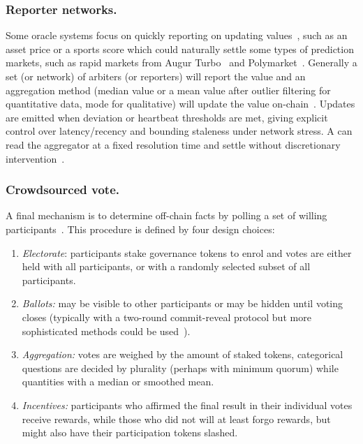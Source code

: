 \subsubsection{Reporter networks.}

Some oracle systems focus on quickly reporting on updating values~\cite{BCCJM21}, such as an asset price or a sports score which could naturally settle some types of prediction markets, such as rapid markets from Augur Turbo~\cite{aug25} and Polymarket~\cite{polylink}. Generally a set (or network) of arbiters (or reporters) will report the value and an aggregation method (\eg median value or a mean value after outlier filtering for quantitative data, mode for qualitative) will update the value on-chain~\cite{ClEsGS21}. Updates are emitted when deviation or heartbeat thresholds are met, giving explicit control over latency/recency and bounding staleness under network stress. A \depm can read the aggregator at a fixed resolution time and settle without discretionary intervention~\cite{aug25,thalesmarket_docs}. 








\subsubsection{Crowdsourced vote.}

A final mechanism is to determine off-chain facts by polling a set of willing participants~\cite{But13,Sz14,AKPWZ15,AKPWZ19,uma,kleros}. This procedure is defined by four design choices:

\begin{enumerate}
\item \textit{Electorate}: participants stake governance tokens to enrol and votes are either held with all participants, or with a randomly selected subset of all participants.
\item \textit{Ballots:} may be visible to other participants or may be hidden until voting closes (typically with a two-round commit-reveal protocol but more sophisticated methods could be used~\cite{GSZB23}).
\item \textit{Aggregation:} votes are weighed by the amount of staked tokens, categorical questions are decided by plurality (perhaps with minimum quorum) while quantities with a median or smoothed mean. 
\item \textit{Incentives:} participants who affirmed the final result in their individual votes receive rewards, while those who did not will at least forgo rewards, but might also have their participation tokens slashed. 
\end{enumerate}

